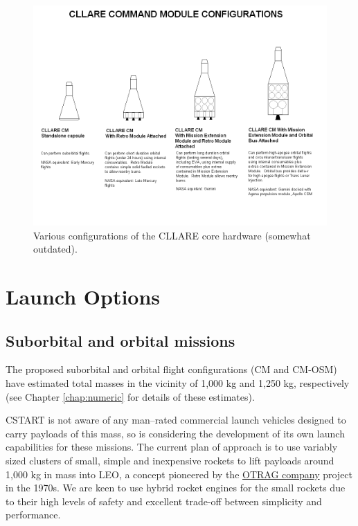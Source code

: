 \documentclass{report}
\begin{document}
\begin{figure}[h] \label{fig:cm_configs}
\includegraphics[angle=270, scale=0.6]{images/cllare_cm_configs}
\caption{Various configurations of the CLLARE core hardware (somewhat outdated).}
\end{figure}

\section{Launch Options}

\subsection{Suborbital and orbital missions}

The proposed suborbital and orbital flight configurations (CM and CM-OSM) have estimated total masses in the vicinity of 1,000 kg and 1,250 kg, respectively (see Chapter \ref{chap:numeric} for details of these estimates).

CSTART is not aware of any man--rated commercial launch vehicles designed to carry payloads of this mass, so is considering the development of its own launch capabilities for these missions.  The current plan of approach is to use variably sized clusters of small, simple and inexpensive rockets to lift payloads around 1,000 kg in mass into LEO, a concept pioneered by the \href{http://en.wikipedia.org/wiki/OTRAG}{OTRAG company} project in the 1970s.  We are keen to use hybrid rocket engines for the small rockets due to their high levels of safety and excellent trade-off between simplicity and performance.
\end{document}
